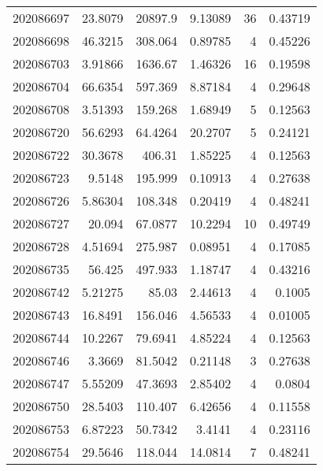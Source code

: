 \begin{tabular}{rrrrrr}
 202086697 &         23.8079  &    20897.9    &            9.13089 &          36 & 0.43719 \\
 202086698 &         46.3215  &      308.064  &            0.89785 &           4 & 0.45226 \\
 202086703 &          3.91866 &     1636.67   &            1.46326 &          16 & 0.19598 \\
 202086704 &         66.6354  &      597.369  &            8.87184 &           4 & 0.29648 \\
 202086708 &          3.51393 &      159.268  &            1.68949 &           5 & 0.12563 \\
 202086720 &         56.6293  &       64.4264 &           20.2707  &           5 & 0.24121 \\
 202086722 &         30.3678  &      406.31   &            1.85225 &           4 & 0.12563 \\
 202086723 &          9.5148  &      195.999  &            0.10913 &           4 & 0.27638 \\
 202086726 &          5.86304 &      108.348  &            0.20419 &           4 & 0.48241 \\
 202086727 &         20.094   &       67.0877 &           10.2294  &          10 & 0.49749 \\
 202086728 &          4.51694 &      275.987  &            0.08951 &           4 & 0.17085 \\
 202086735 &         56.425   &      497.933  &            1.18747 &           4 & 0.43216 \\
 202086742 &          5.21275 &       85.03   &            2.44613 &           4 & 0.1005  \\
 202086743 &         16.8491  &      156.046  &            4.56533 &           4 & 0.01005 \\
 202086744 &         10.2267  &       79.6941 &            4.85224 &           4 & 0.12563 \\
 202086746 &          3.3669  &       81.5042 &            0.21148 &           3 & 0.27638 \\
 202086747 &          5.55209 &       47.3693 &            2.85402 &           4 & 0.0804  \\
 202086750 &         28.5403  &      110.407  &            6.42656 &           4 & 0.11558 \\
 202086753 &          6.87223 &       50.7342 &            3.4141  &           4 & 0.23116 \\
 202086754 &         29.5646  &      118.044  &           14.0814  &           7 & 0.48241 \\

\end{tabular}
